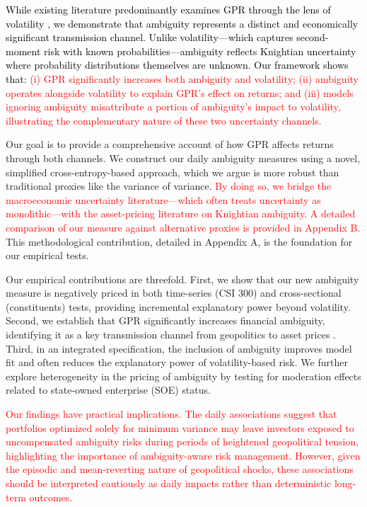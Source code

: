 \documentclass[preprint,12pt,authoryear]{elsarticle}
\begin{document}
\textcolor{black}{While existing literature predominantly examines GPR through the lens of volatility \citep{Salisu2021}, we demonstrate that ambiguity represents a distinct and economically significant transmission channel. Unlike volatility---which captures second-moment risk with known probabilities---ambiguity reflects Knightian uncertainty where probability distributions themselves are unknown. Our framework shows that: \textcolor{red}{(i) GPR significantly increases both ambiguity and volatility; (ii) ambiguity operates alongside volatility to explain GPR's effect on returns; and (iii) models ignoring ambiguity misattribute a portion of ambiguity's impact to volatility, illustrating the complementary nature of these two uncertainty channels.}}

Our goal is to provide a comprehensive account of how GPR affects returns through both channels. We construct our daily ambiguity measures using a novel, simplified cross-entropy-based approach, which we argue is more robust than traditional proxies like the variance of variance. \textcolor{red}{By doing so, we bridge the macroeconomic uncertainty literature---which often treats uncertainty as monolithic---with the asset-pricing literature on Knightian ambiguity. A detailed comparison of our measure against alternative proxies is provided in Appendix B.} This methodological contribution, detailed in Appendix A, is the foundation for our empirical tests.

Our empirical contributions are threefold. First, we show that our new ambiguity measure is negatively priced in both time-series (CSI 300) and cross-sectional (constituents) tests, providing incremental explanatory power beyond volatility. Second, we establish that GPR significantly increases financial ambiguity, identifying it as a key transmission channel from geopolitics to asset prices \citep{Caldara2022}. Third, in an integrated specification, the inclusion of ambiguity improves model fit and often reduces the explanatory power of volatility-based risk. We further explore heterogeneity in the pricing of ambiguity by testing for moderation effects related to state-owned enterprise (SOE) status.

\textcolor{red}{Our findings have practical implications. The daily associations suggest that portfolios optimized solely for minimum variance may leave investors exposed to uncompensated ambiguity risks during periods of heightened geopolitical tension, highlighting the importance of ambiguity-aware risk management. However, given the episodic and mean-reverting nature of geopolitical shocks, these associations should be interpreted cautiously as daily impacts rather than deterministic long-term outcomes.}
\end{document}

